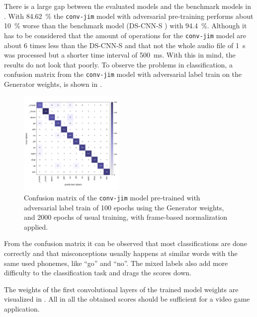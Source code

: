 There is a large gap between the evaluated models and the benchmark models in .
With \SI{84.62}{\percent} the \texttt{conv-jim} model with adversarial pre-training performs about \SI{10}{\percent} worse than the benchmark model (DS-CNN-S \cite{Zhang2017}) with \SI{94.4}{\percent}.
Although it has to be considered that the amount of operations for the \texttt{conv-jim} model are about 6 times less than the DS-CNN-S and that not the whole audio file of \SI{1}{\second} was processed but a shorter time interval of \SI{500}{\milli\second}.
With this in mind, the results do not look that poorly.
To observe the problems in classification, a confusion matrix from the \texttt{conv-jim} model with adversarial label train on the Generator weights, is shown in .
\begin{figure}[!ht]
  \centering
  \includegraphics[width=0.45\textwidth]{./5_exp/figs/exp_final_confusion.png}
  \caption{Confusion matrix of the \texttt{conv-jim} model pre-trained with adversarial label train of 100 epochs using the Generator weights, and 2000 epochs of usual training, with frame-based normalization applied.}
  \label{fig:exp_final_confusion}
\end{figure}
\FloatBarrier
\noindent
From the confusion matrix it can be observed that most classifications are done correctly and that misconceptions usually happens at similar words with the same used phonemes, like \enquote{go} and \enquote{no}.
The mixed labels also add more difficulty to the classification task and drags the scores down.

The weights of the first convolutional layers of the trained model weights are visualized in .
All in all the obtained scores should be sufficient for a video game application.
